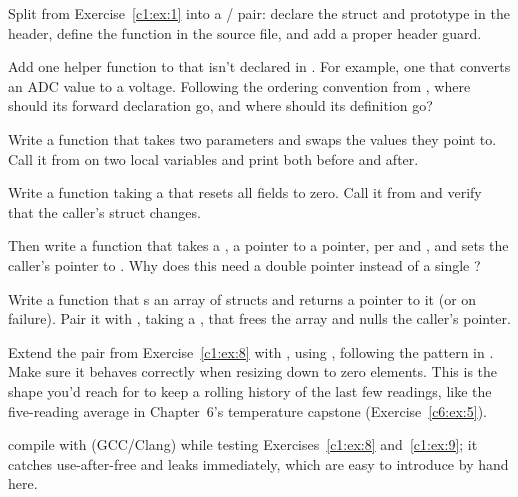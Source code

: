 \label{c1:set:2}

\label{c1:ex:4}
Split  from Exercise~\ref{c1:ex:1} into a
/ pair: declare the struct and prototype in the header,
define the function in the source file, and add a proper header guard.

\label{c1:ex:5}
Add one  helper function to  that isn't declared in
. For example, one that converts an ADC value to a voltage. Following the
ordering convention from , where should its forward declaration go, and where should
its definition go?

\label{c1:set:3}

\label{c1:ex:6}
Write a function  that takes two  parameters and swaps the values they
point to. Call it from  on two local variables and print both before and after.

\label{c1:ex:7}
Write a function  taking a  that resets all fields
to zero. Call it from  and verify that the caller's struct changes.

Then write a function  that takes a , a pointer
to a pointer, per  and , and sets the caller's pointer to
. Why does this need a double pointer instead of a single ?

\label{c1:set:4}

\label{c1:ex:8}
Write a function  that s an array of
  structs and returns a pointer to it (or  on failure).
Pair it with , taking a , that frees the
array and nulls the caller's pointer.

\label{c1:ex:9}
Extend the pair from Exercise~\ref{c1:ex:8} with , using
, following the pattern in . Make sure it behaves correctly when
resizing down to zero elements. This is the shape you'd reach for to keep a rolling history of the
last few readings, like the five-reading average in Chapter~6's temperature capstone
(Exercise~\ref{c6:ex:5}).

\note[Tip] compile with  (GCC/Clang) while testing
Exercises~\ref{c1:ex:8} and~\ref{c1:ex:9}; it catches use-after-free and leaks immediately, which
are easy to introduce by hand here.
